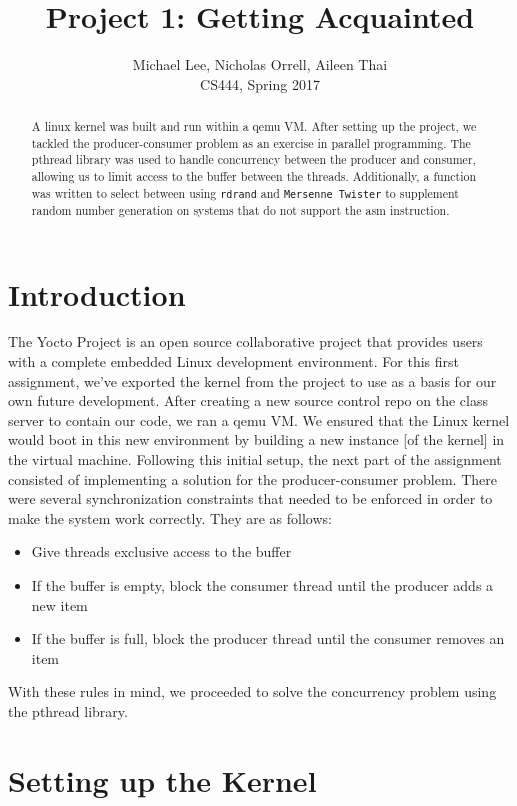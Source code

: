 \documentclass[letterpaper, 10pt, notitlepage]{article}
\title{Project 1: Getting Acquainted}
\author{Michael Lee, Nicholas Orrell, Aileen Thai \\ CS444, Spring 2017}
\date{}
\begin{document}
\maketitle

\begin{abstract}
A linux kernel was built and run within a qemu VM. After setting up the project, we tackled the producer-consumer problem as an exercise in parallel programming. The pthread library was used to handle concurrency between the producer and consumer, allowing us to limit access to the buffer between the threads. Additionally, a function was written to select between using \texttt{rdrand} and \texttt{Mersenne Twister} to supplement random number generation on systems that do not support the asm instruction.
\end{abstract}
\clearpage

\section{Introduction}
The Yocto Project is an open source collaborative project that provides users with a complete embedded Linux development environment. For this first assignment, we’ve exported the kernel from the project to use as a basis for our own future development. 
\newline \newline
After creating a new source control repo on the class server to contain our code, we ran a qemu VM. We ensured that the Linux kernel would boot in this new environment by building a new instance [of the kernel] in the virtual machine. Following this initial setup, the next part of the assignment consisted of implementing a solution for the producer-consumer problem. There were several synchronization constraints that needed to be enforced in order to make the system work correctly. They are as follows:
\begin{itemize}
\item Give threads exclusive access to the buffer
\item If the buffer is empty, block the consumer thread until the producer adds a new item
\item If the buffer is full, block the producer thread until the consumer removes an item
\end{itemize}
With these rules in mind, we proceeded to solve the concurrency problem using the pthread library.

\section{Setting up the Kernel}
\end{document}
